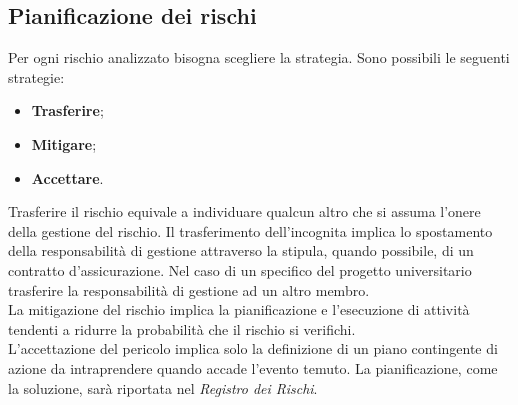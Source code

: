 \documentclass[12pt,a4paper,titlepage]{article}
\begin{document}
	\subsection{Pianificazione dei rischi}
		Per ogni rischio analizzato bisogna scegliere la strategia. Sono possibili le seguenti strategie:
		\begin{itemize}
			\item \textbf{Trasferire};
			\item \textbf{Mitigare};
			\item \textbf{Accettare}.
		\end{itemize}
		Trasferire il rischio equivale a individuare qualcun altro che si assuma l'onere della gestione del rischio.
		Il trasferimento dell'incognita implica lo spostamento della responsabilità di gestione attraverso la stipula, quando possibile, di un contratto d'assicurazione. Nel caso di un specifico del progetto universitario trasferire la responsabilità di gestione ad un altro membro.\\
		La mitigazione del rischio implica la pianificazione e l'esecuzione di attività tendenti a ridurre la probabilità che il rischio si verifichi.\\
		L'accettazione del pericolo implica solo la definizione di un piano contingente di azione da intraprendere quando accade l'evento temuto. La pianificazione, come la soluzione, sarà riportata nel \textit{Registro dei Rischi}.
	
\end{document}
